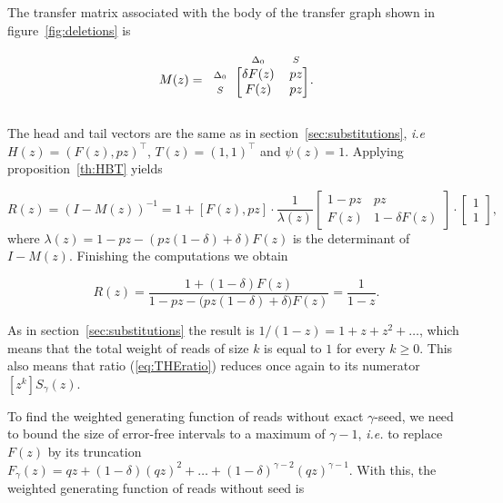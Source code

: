 \documentclass{article}
\newcommand{\smS}{\scriptstyle{S}}
\newcommand{\smDELz}{\scriptstyle{\Delta_0}}
\begin{document}
The transfer matrix associated with the body of the transfer graph shown
in figure~\ref{fig:deletions} is

\begin{equation*}
M(z) = 
\begin{blockarray}{ccc}
       & \smDELz & \smS \\
\begin{block}{c[cc]}
\smDELz & \delta F(z) & pz \\
\smS    &        F(z) & pz \\
\end{block}
\end{blockarray}.
\end{equation*}

The head and tail vectors are the same as in
section~\ref{sec:substitutions}, \textit{i.e}
$H(z) = (F(z), pz)^\top$, $T(z) = (1,1)^\top$ and $\psi(z) = 1$.
Applying proposition~\ref{th:HBT} yields

\begin{equation*}
R(z) = (I-M(z))^{-1} =
1 + [F(z), pz] \cdot \frac{1}{\lambda(z)}
\begin{bmatrix}
1-pz  & pz              \\
F(z) & 1 -\delta F(z)
\end{bmatrix}
\cdot \begin{bmatrix}1 \\ 1\end{bmatrix},
\end{equation*}
where $\lambda(z) = 1-pz-(pz(1-\delta)+\delta)F(z)$ is the determinant of
$I-M(z)$. Finishing the computations we obtain

\begin{equation}
\label{eq:Rdel}
R(z) = \frac{1+(1-\delta)F(z)} {1-pz - \big(pz(1-\delta) + \delta\big)F(z)}
= \frac{1}{1-z}.
\end{equation}

As in section~\ref{sec:substitutions} the result is $1/(1-z) = 1+z +z^2 +
\ldots$, which means that the total weight of reads of size $k$ is equal
to $1$ for every $k \geq 0$. This also means that ratio
(\ref{eq:THEratio}) reduces once again to its numerator
$[z^k]S_\gamma(z)$.

To find the weighted generating function of reads without exact
$\gamma$-seed, we need to bound the size of error-free intervals to a
maximum of $\gamma-1$, \textit{i.e.} to replace $F(z)$ by its truncation
$F_\gamma(z) = qz + (1-\delta)(qz)^2 + \ldots +
(1-\delta)^{\gamma-2}(qz)^{\gamma-1}$. With this, the weighted generating
function of reads without seed is
\end{document}
